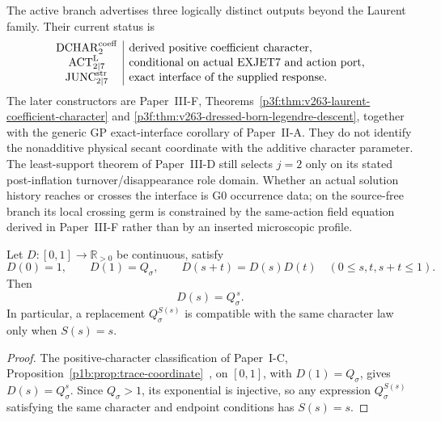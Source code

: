 \documentclass[11pt,a4paper]{article}
\begin{document}
\begin{definition}
\label{p3e:post:laur17-action-realization}
The active branch advertises three logically distinct outputs beyond the
Laurent family.  Their current status is
\[
\begin{array}{c|l}
 \mathrm{DCHAR}_{2}^{\rm coeff}&\text{derived positive coefficient character},\\
 \mathrm{ACT}_{2\mid7}^{\rm L}&\text{conditional on actual EXJET7 and action port},\\
 \mathrm{JUNC}_{2\mid7}^{\rm str}&\text{exact interface of the supplied response}.
\end{array}
\]
The later constructors are Paper~III-F,
Theorems~\ref{p3f:thm:v263-laurent-coefficient-character} and
\ref{p3f:thm:v263-dressed-born-legendre-descent}, together with the generic
GP exact-interface corollary of Paper~II-A.  They do not identify the
nonadditive physical secant coordinate with the additive character parameter.
The least-support theorem of Paper~III-D still selects \(j=2\) only on its
stated post-inflation turnover/disappearance role domain.  Whether an actual
solution history reaches or crosses the interface is G0 occurrence data; on
the source-free branch its local crossing germ is constrained by the
same-action field equation derived in Paper~III-F rather than by an inserted
microscopic profile.
\end{definition}

\begin{lemma}
\label{p3e:lem:unique-character-dressing}
Let \(D:[0,1]\to\mathbb R_{>0}\) be continuous, satisfy
\[
 D(0)=1,\qquad D(1)=Q_\sigma,\qquad
 D(s+t)=D(s)D(t)
 \quad(0\le s,t, s+t\le1).
\]
Then
\begin{equation}
\label{p3e:eq:unique-character-dressing}
 \boxed{D(s)=Q_\sigma^{\,s}.}
\end{equation}
In particular, a replacement \(Q_\sigma^{S(s)}\) is compatible with the
same character law only when \(S(s)=s\).
\end{lemma}

\begin{proof}
The positive-character classification of Paper~I-C,
Proposition~\ref{p1b:prop:trace-coordinate}~\cite{Kugelmann2026Paper1C},
on \([0,1]\), with \(D(1)=Q_\sigma\), gives \(D(s)=Q_\sigma^s\).
Since \(Q_\sigma>1\), its exponential is injective, so any expression
\(Q_\sigma^{S(s)}\) satisfying the same character and endpoint conditions
has \(S(s)=s\).
\end{proof}
\end{document}
